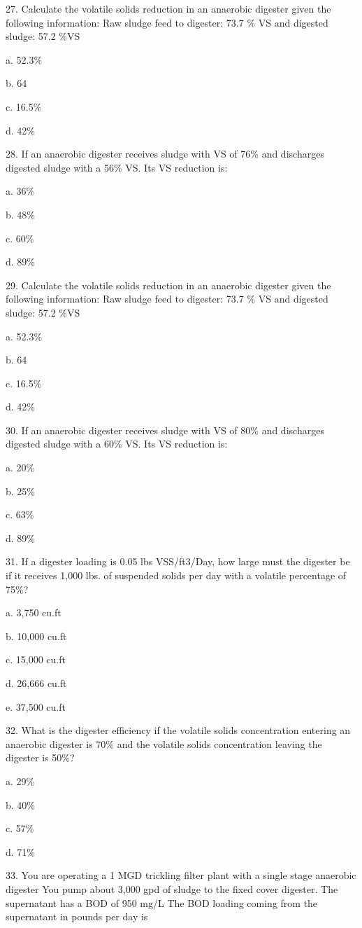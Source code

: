 \documentclass{article}
\begin{document}
27. Calculate the volatile solids reduction in an anaerobic digester given the following information: Raw sludge feed to digester: 73.7 \% VS and digested sludge: 57.2 \%VS 

a. 52.3\% 

b. 64 

c. 16.5\% 

d. 42\% 


28. If an anaerobic digester receives sludge with VS of 76\% and discharges digested sludge with a 56\% VS. Its VS reduction is: 

a. 36\% 

b. 48\% 

c. 60\% 

d. 89\% 


29. Calculate the volatile solids reduction in an anaerobic digester given the following information: Raw sludge feed to digester: 73.7 \% VS and digested sludge: 57.2 \%VS 

a. 52.3\% 

b. 64 

c. 16.5\% 

d. 42\% 


30. If an anaerobic digester receives sludge with VS of 80\% and discharges digested sludge with a 60\% VS. Its VS reduction is: 

a. 20\% 

b. 25\% 

c. 63\% 

d. 89\% 


31. If a digester loading is 0.05 lbs VSS/ft3/Day, how large must the digester be if it receives 1,000 lbs. of suspended solids per day with a volatile percentage of 75\%? 

a. 3,750 cu.ft 

b. 10,000 cu.ft 

c. 15,000 cu.ft 

d. 26,666 cu.ft 

e. 37,500 cu.ft 


32. What is the digester efficiency if the volatile solids concentration entering an anaerobic digester is 70\% and the volatile solids concentration leaving the digester is 50\%? 

a. 29\% 

b. 40\% 

c. 57\% 

d. 71\% 


33. You are operating a 1 MGD trickling filter plant with a single stage anaerobic digester You pump about 3,000 gpd of sludge to the fixed cover digester. The supernatant has a BOD of 950 mg/L The BOD loading coming from the supernatant in pounds per day is 
\end{document}
